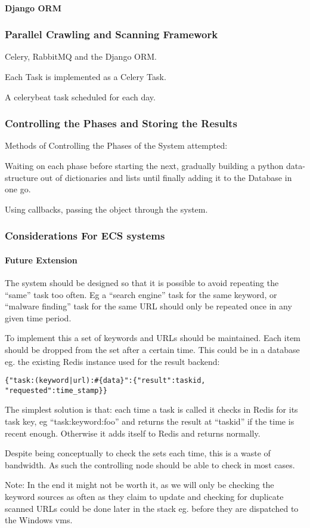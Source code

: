 \paragraph{Django ORM}

\subsubsection{Parallel Crawling and Scanning Framework}
Celery, RabbitMQ and the Django ORM.

Each Task is implemented as a Celery Task.

A celerybeat task scheduled for each day.

\subsubsection{Controlling the Phases and Storing the Results}
Methods of Controlling the Phases of the System attempted:

Waiting on each phase before starting the next, gradually building a python data-structure out of dictionaries and lists until finally adding it to the Database in one go.

Using callbacks, passing the object through the system.

\subsubsection{Considerations For ECS systems}

\paragraph{Future Extension}
The system should be designed so that it is possible to avoid repeating the ``same'' task too often. Eg a ``search engine'' task for the same keyword, or ``malware finding'' task for the same URL should only be repeated once in any given time period.

To implement this a set of keywords and URLs should be maintained. Each item should be dropped from the set after a certain time. This could be in a database eg. the existing Redis instance used for the result backend:

\verb/{"task:(keyword|url):#{data}":{"result":taskid, "requested":time_stamp}}/

The simplest solution is that: each time a task is called it checks in Redis for its task key, eg ``task:keyword:foo'' and returns the result at ``taskid'' if the time is recent enough. Otherwise it adds itself to Redis and returns normally.

Despite being conceptually to check the sets each time, this is a waste of bandwidth. As such the controlling node should be able to check in most cases.

Note: In the end it might not be worth it, as we will only be checking the keyword sources as often as they claim to update and checking for duplicate scanned URLs could be done later in the stack eg. before they are dispatched to the Windows vms.